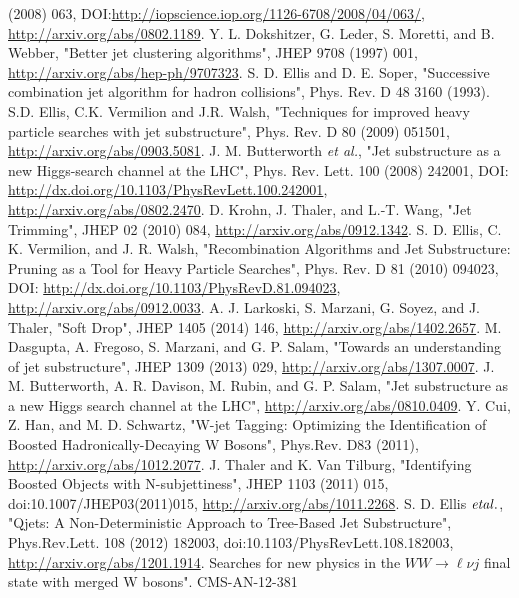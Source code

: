 \begin{thebibliography}{99}
(2008) 063, DOI:{\url{http://iopscience.iop.org/1126-6708/2008/04/063/}}, \url{http://arxiv.org/abs/0802.1189}.
 {Y. L. Dokshitzer}, G. Leder, S. Moretti, and B. Webber, "Better jet clustering algorithms",
JHEP 9708 (1997) 001, \url{http://arxiv.org/abs/hep-ph/9707323}.
 S. D. Ellis and D. E. Soper, "Successive combination jet algorithm for hadron collisions", Phys.
Rev. D 48 3160 (1993).
 S.D. Ellis, C.K. Vermilion and J.R. Walsh, "Techniques for improved heavy particle searches
with jet substructure", Phys. Rev. D 80 (2009) 051501, \url{http://arxiv.org/abs/0903.5081}. 
 J. M. Butterworth {\it et al.}, "Jet substructure as a new Higgs-search channel at the LHC",
Phys. Rev. Lett. 100 (2008) 242001, DOI: {\url{http://dx.doi.org/10.1103/PhysRevLett.100.242001}}, \url{http://arxiv.org/abs/0802.2470}.
 D. Krohn, J. Thaler, and L.-T. Wang, "Jet Trimming", JHEP 02 (2010) 084, {\url{http://arxiv.org/abs/0912.1342}}.
 S. D. Ellis, C. K. Vermilion, and J. R. Walsh, "Recombination Algorithms and Jet
Substructure: Pruning as a Tool for Heavy Particle Searches", Phys. Rev. D 81 (2010) 094023, DOI: {\url{http://dx.doi.org/10.1103/PhysRevD.81.094023}}, \url{http://arxiv.org/abs/0912.0033}.
 A. J. Larkoski, S. Marzani, G. Soyez, and J. Thaler, "Soft Drop", JHEP 1405 (2014) 146, \url{http://arxiv.org/abs/1402.2657}.
 M. Dasgupta, A. Fregoso, S. Marzani, and G. P. Salam, "Towards an understanding of jet
substructure", JHEP 1309 (2013) 029, \url{http://arxiv.org/abs/1307.0007}.
 J. M. Butterworth, A. R. Davison, M. Rubin, and G. P. Salam, "Jet substructure as a new
Higgs search channel at the LHC", \url{http://arxiv.org/abs/0810.0409}.
 Y. Cui, Z. Han, and M. D. Schwartz, "W-jet Tagging: Optimizing the Identification of Boosted Hadronically-Decaying W Bosons", Phys.Rev. D83 (2011), \url{http://arxiv.org/abs/1012.2077}.
 J. Thaler and K. Van Tilburg, "Identifying Boosted Objects with N-subjettiness", JHEP 1103 (2011) 015, doi:10.1007/JHEP03(2011)015, {\url{http://arxiv.org/abs/1011.2268}}.
 S. D. Ellis $\it et al.$, "Qjets: A Non-Deterministic Approach to Tree-Based Jet Substructure", Phys.Rev.Lett. 108 (2012) 182003, doi:10.1103/PhysRevLett.108.182003, \url{http://arxiv.org/abs/1201.1914}.
 Searches for new physics in the $WW\rightarrow \ell\nu j$ final state with merged W bosons". CMS-AN-12-381

\end{thebibliography}
